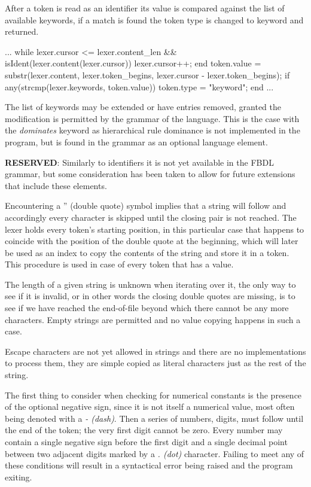 After a token is read as an identifier its value is compared against the list of available keywords, if a match is found the token type is changed to keyword and returned.

\begin{octave}
...
while lexer.cursor <= lexer.content_len &&
		isIdent(lexer.content(lexer.cursor))
  lexer.cursor++;
end
token.value = substr(lexer.content, lexer.token_begins,
		lexer.cursor - lexer.token_begins);
if any(strcmp(lexer.keywords, token.value))
  token.type = "keyword";
end
...
\end{octave}

The list of keywords may be extended or have entries removed, granted the modification is permitted by the grammar of the language. This is the case with the \textit{dominates} keyword as hierarchical rule dominance is not implemented in the program, but is found in the grammar as an optional language element.

\textbf{RESERVED}: Similarly to identifiers it is not yet available in the FBDL grammar, but some consideration has been taken to allow for future extensions that include these elements.

Encountering a '' (double quote) symbol implies that a string will follow and accordingly every character is skipped until the closing pair is not reached. The lexer holds every token's starting position, in this particular case that happens to coincide with the position of the double quote at the beginning, which will later be used as an index to copy the contents of the string and store it in a token. This procedure is used in case of every token that has a value.

The length of a given string is unknown when iterating over it, the only way to see if it is invalid, or in other words the closing double quotes are missing, is to see if we have reached the end-of-file beyond which there cannot be any more characters. Empty strings are permitted and no value copying happens in such a case.

Escape characters are not yet allowed in strings and there are no implementations to process them, they are simple copied as literal characters just as the rest of the string.

The first thing to consider when checking for numerical constants is the presence of the optional negative sign, since it is not itself a numerical value, most often being denoted with a \textit{- (dash)}. Then a series of numbers, digits, must follow until the end of the token; the very first digit cannot be zero. Every number may contain a single negative sign before the first digit and a single decimal point between two adjacent digits marked by a \textit{. (dot)} character. Failing to meet any of these conditions will result in a syntactical error being raised and the program exiting.

